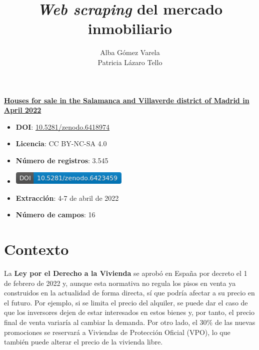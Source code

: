 \documentclass[12pt]{article}
\title{\textit{Web scraping} del mercado inmobiliario}
\author{Alba Gómez Varela\\Patricia Lázaro Tello}
\date{}	%
\begin{document}

\maketitle
\thispagestyle{uoc}

\begin{framed}
	\textbf{\underline{Houses for sale in the Salamanca and Villaverde district of Madrid in April 2022}}
	\begin{multicols}{2}
		\begin{itemize}[topsep=0cm,partopsep=0cm,label={},wide]
			\item \textbf{DOI}: \href{https://doi.org/10.5281/zenodo.6423459}{10.5281/zenodo.6418974}
			\item \textbf{Licencia}: CC BY-NC-SA 4.0
			\item \textbf{Número de registros}: 3.545
			\columnbreak
			\item \includegraphics[height=0.6cm]{zenodo.6423459}
			\item \textbf{Extracción}: 4-7 de abril de 2022
			\item \textbf{Número de campos}: 16
		\end{itemize}
	\end{multicols}
\end{framed}

\vspace{-2em}

\section{Contexto}\label{contexto}\vspace{-1.0em}

La \textbf{Ley por el Derecho a la Vivienda} se aprobó en España por decreto el 1 de febrero de 2022 y, aunque esta normativa no regula los pisos en venta ya construidos en la actualidad de forma directa, sí que podría afectar a su precio en el futuro. Por ejemplo, si se limita el precio del alquiler, se puede dar el caso de que los inversores dejen de estar interesados en estos bienes y, por tanto, el precio final de venta variaría al cambiar la demanda. Por otro lado, el 30\% de las nuevas promociones se reservará a Viviendas de Protección Oficial (VPO), lo que también puede alterar el precio de la vivienda libre.
\end{document}
